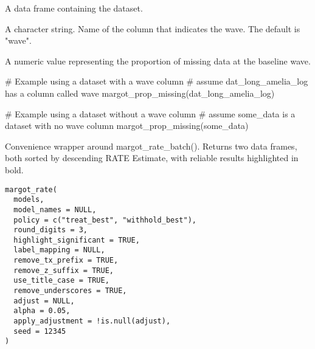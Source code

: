 \documentclass[a4paper]{book}
\begin{document}
%
\begin{Arguments}
\begin{ldescription}
\item[\code{data}] A data frame containing the dataset.

\item[\code{wave\_col}] A character string. Name of the column that indicates the wave.
The default is "wave".
\end{ldescription}
\end{Arguments}
%
\begin{Value}
A numeric value representing the proportion of missing data at the baseline wave.
\end{Value}
%
\begin{Examples}
\begin{ExampleCode}
# Example using a dataset with a wave column
# assume dat_long_amelia_log has a column called wave
margot_prop_missing(dat_long_amelia_log)

# Example using a dataset without a wave column
# assume some_data is a dataset with no wave column
margot_prop_missing(some_data)
\end{ExampleCode}
\end{Examples}
%
\begin{Description}
Convenience wrapper around margot\_rate\_batch(). Returns two data frames,
both sorted by descending RATE Estimate, with reliable results highlighted in bold.
\end{Description}
%
\begin{Usage}
\begin{verbatim}
margot_rate(
  models,
  model_names = NULL,
  policy = c("treat_best", "withhold_best"),
  round_digits = 3,
  highlight_significant = TRUE,
  label_mapping = NULL,
  remove_tx_prefix = TRUE,
  remove_z_suffix = TRUE,
  use_title_case = TRUE,
  remove_underscores = TRUE,
  adjust = NULL,
  alpha = 0.05,
  apply_adjustment = !is.null(adjust),
  seed = 12345
)
\end{verbatim}
\end{Usage}
%
\end{document}
